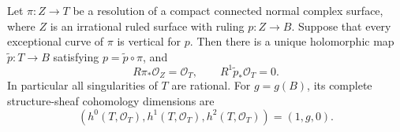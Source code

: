 
\begin{proposition}\label{cdp:st:A.5.8}
Let $\pi:Z\to T$ be a resolution of a compact connected
normal complex surface, where $Z$ is an irrational ruled
surface with ruling $p:Z\to B$. Suppose that every
exceptional curve of $\pi$ is vertical for $p$.
Then there is a unique holomorphic map
$\widetilde p:T\to B$ satisfying
$p=\widetilde p\circ\pi$, and
\[
 R\pi_*\mathcal O_Z=\mathcal O_T,
 \qquad R^1\widetilde p_*\mathcal O_T=0.           \tag{A.J.17}\label{cdp:eq:A.J.17}
\]
In particular all singularities of $T$ are rational. For
$g=g(B)$, its complete structure-sheaf cohomology dimensions
are
\[
 (h^0(T,\mathcal O_T),h^1(T,\mathcal O_T),
                         h^2(T,\mathcal O_T))=(1,g,0).
                                                        \tag{A.J.18}\label{cdp:eq:A.J.18}
\]
\end{proposition}
